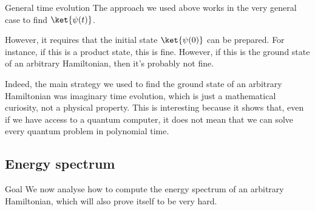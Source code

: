 \documentclass[a4paper]{article}
\begin{document}
\begin{parag}{General time evolution}
    The approach we used above works in the very general case to find $\ket{\psi\left(t\right)}$.

    However, it requires that the initial state $\ket{\psi\left(0\right)}$ can be prepared. For instance, if this is a product state, this is fine. However, if this is the ground state of an arbitrary Hamiltonian, then it's probably not fine.

    Indeed, the main strategy we used to find the ground state of an arbitrary Hamiltonian was imaginary time evolution, which is just a mathematical curiosity, not a physical property. This is interesting because it shows that, even if we have access to a quantum computer, it does not mean that we can solve every quantum problem in polynomial time.
\end{parag}

\subsection{Energy spectrum}

\begin{parag}{Goal}
    We now analyse how to compute the energy spectrum of an arbitrary Hamiltonian, which will also prove itself to be very hard.
\end{parag}
\end{document}
